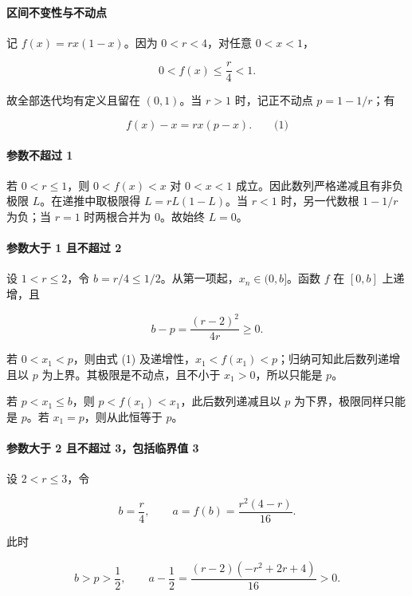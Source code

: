 \documentclass[11pt,a4paper]{article}
\begin{document}
\paragraph{区间不变性与不动点}\label{ux533aux95f4ux4e0dux53d8ux6027ux4e0eux4e0dux52a8ux70b9}

记 \(f(x)=rx(1-x)\)。因为 \(0<r<4\)，对任意 \(0<x<1\)，

\[
0<f(x)\le\frac r4<1.
\]

故全部迭代均有定义且留在 \((0,1)\)。当 \(r>1\) 时，记正不动点
\(p=1-1/r\)；有

\[
f(x)-x=rx(p-x).
\qquad\text{(1)}
\]

\paragraph{参数不超过 1}\label{ux53c2ux6570ux4e0dux8d85ux8fc7-1}

若 \(0<r\le1\)，则 \(0<f(x)<x\) 对 \(0<x<1\)
成立。因此数列严格递减且有非负极限 \(L\)。在递推中取极限得
\(L=rL(1-L)\)。当 \(r<1\) 时，另一代数根 \(1-1/r\) 为负；当 \(r=1\)
时两根合并为 \(0\)。故始终 \(L=0\)。

\paragraph{参数大于 1 且不超过
2}\label{ux53c2ux6570ux5927ux4e8e-1-ux4e14ux4e0dux8d85ux8fc7-2}

设 \(1<r\le2\)，令 \(b=r/4\le1/2\)。从第一项起，\(x_n\in(0,b]\)。函数
\(f\) 在 \([0,b]\) 上递增，且

\[
b-p=\frac{(r-2)^2}{4r}\ge0.
\]

若 \(0<x_1<p\)，则由式 (1)
及递增性，\(x_1<f(x_1)<p\)；归纳可知此后数列递增且以 \(p\)
为上界。其极限是不动点，且不小于 \(x_1>0\)，所以只能是 \(p\)。

若 \(p<x_1\le b\)，则 \(p<f(x_1)<x_1\)，此后数列递减且以 \(p\)
为下界，极限同样只能是 \(p\)。若 \(x_1=p\)，则从此恒等于 \(p\)。

\paragraph{参数大于 2 且不超过 3，包括临界值
3}\label{ux53c2ux6570ux5927ux4e8e-2-ux4e14ux4e0dux8d85ux8fc7-3ux5305ux62ecux4e34ux754cux503c-3}

设 \(2<r\le3\)，令

\[
b=\frac r4,\qquad a=f(b)=\frac{r^2(4-r)}{16}.
\]

此时

\[
b>p>\frac12,\qquad
 a-\frac12=\frac{(r-2)(-r^2+2r+4)}{16}>0.
\]
\end{document}
